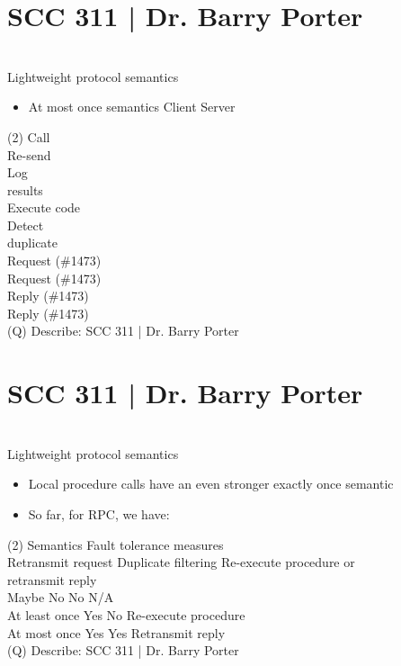 \documentclass[12pt]{article}
\begin{document}
\section{SCC 311 | Dr. Barry Porter}
\\
Lightweight protocol semantics\\
\begin{itemize}
  \item At most once semantics Client Server
\end{itemize}(2)
Call\\
Re-send\\
Log \\
results\\
Execute code\\
Detect \\
duplicate\\
Request (\#1473)\\
Request (\#1473)\\
Reply (\#1473)\\
Reply (\#1473)\\
\clearpage
(Q)
Describe: SCC 311 | Dr. Barry Porter
\clearpage
\section{SCC 311 | Dr. Barry Porter}
\\
Lightweight protocol semantics\\
\begin{itemize}
  \item Local procedure calls have an even stronger exactly once semantic
  \item So far, for RPC, we have:
\end{itemize}(2)
Semantics Fault tolerance measures\\
Retransmit request Duplicate filtering Re-execute procedure or \\
retransmit reply\\
Maybe No No N/A\\
At least once Yes No Re-execute procedure\\
At most once Yes Yes Retransmit reply\\
\clearpage
(Q)
Describe: SCC 311 | Dr. Barry Porter
\clearpage
\end{document}
